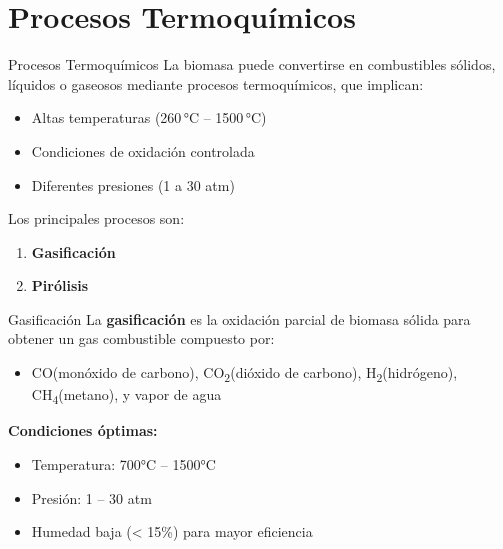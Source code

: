 \documentclass[../../main.tex]{subfiles}
\begin{document}
\section{Procesos Termoquímicos}
\begin{frame}{Procesos Termoquímicos}
\justifying
La biomasa puede convertirse en combustibles sólidos, líquidos o gaseosos mediante procesos termoquímicos, que implican:

\begin{itemize}
  \item Altas temperaturas (260 °C – 1500 °C)
  \item Condiciones de oxidación controlada
  \item Diferentes presiones (1 a 30 atm)
\end{itemize}

\vspace{0.5em}
Los principales procesos son:
\begin{enumerate}
  \item \textbf{Gasificación}
  \item \textbf{Pirólisis}
\end{enumerate}
\end{frame}
\begin{frame}{Gasificación}
\justifying
La \textbf{gasificación} es la oxidación parcial de biomasa sólida para obtener un gas combustible compuesto por:

\begin{itemize}
  \item CO(monóxido de carbono), CO\textsubscript{2}(dióxido de carbono), H\textsubscript{2}(hidrógeno), CH\textsubscript{4}(metano), y vapor de agua
\end{itemize}

\vspace{0.5em}
\textbf{Condiciones óptimas:}
\begin{itemize}
  \item Temperatura: 700°C – 1500°C
  \item Presión: 1 – 30 atm
  \item Humedad baja (< 15\%) para mayor eficiencia
\end{itemize}
\end{frame}
\end{document}
